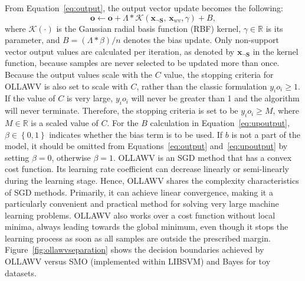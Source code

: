 \documentclass[reqno]{vcuthesis}
\newcommand{\set}[1]{{\left\{#1\right\}}}
\newcommand{\reals}{{\mathbb{R}}}
\numberwithin{equation}{chapter}
\begin{document}
From Equation~\ref{eq:output}, the output vector update becomes the following: 
\begin{equation}
\label{eq:upoutput}
\bm o \leftarrow \bm o + \Lambda*\mathcal{K}\left(\bm{x}_{\neg \bm S},\, \bm{x}_{wv}, \gamma \right) + B,
\end{equation}
where $\mathcal{K}(\cdot)$ is the Gaussian radial basis function (RBF) kernel, $\gamma \in \reals$ is its parameter, and $B = (\Lambda * \beta)/n$ denotes the bias update. Only non-support vector output values are calculated per iteration, as denoted by $\bm x_{\neg \bm S}$ in the kernel function, because samples are never selected to be updated more than once. Because the output values scale with the $C$ value, the stopping criteria for OLLAWV is also set to scale with $C$, rather than the classic formulation $y_i o_i \geq 1$. If the value of $C$ is very large, $y_i o_i$ will never be greater than 1 and the algorithm will never terminate. Therefore, the stopping criteria is set to be $y_i o_i \geq M$, where $M \in \reals$ is a scaled value of $C$. For the $B$ calculation in Equation~\ref{eq:upoutput}, $\beta \in \set{0,1}$ indicates whether the bias term is to be used. If $b$ is not a part of the model, it should be omitted from Equations~\ref{eq:output} and~\ref{eq:upoutput} by setting $\beta = 0$, otherwise $\beta = 1$. 
\newpage
OLLAWV is an SGD method that has a convex cost function. Its learning rate coefficient can decrease linearly or semi-linearly during the learning stage. Hence, OLLAWV shares the complexity characteristics of SGD methods. Primarily, it can achieve linear convergence, making it a particularly convenient and practical method for solving very large machine learning problems. OLLAWV also works over a cost function without local minima, always leading towards the global minimum, even though it stops the learning process as soon as all samples are outside the prescribed margin. Figure~\ref{fig:ollawvseparation} shows the decision boundaries achieved by OLLAWV versus SMO (implemented within LIBSVM) and Bayes for toy datasets. 
\end{document}
